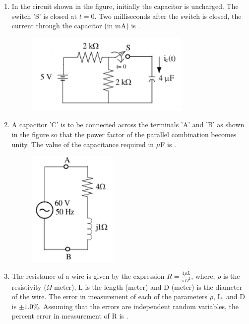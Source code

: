 \documentclass[journal,12pt,onecolumn]{IEEEtran}
\theoremstyle{remark}
\begin{document}
\begin{enumerate}
    \item In the circuit shown in the figure, initially the capacitor is uncharged. The switch 'S' is closed at $t=0$. Two milliseconds after the switch is closed, the current through the capacitor (in mA) is \underline{\hspace{2cm}}.
    \begin{figure}[H]
        \centering
        \includegraphics[width=0.4\columnwidth]{q29}
        \caption*{}
        \label{fig:placeholder}
    \end{figure}
    
    \item A capacitor 'C' is to be connected across the terminals 'A' and 'B' as shown in the figure so that the power factor of the parallel combination becomes unity. The value of the capacitance required in $\mu$F is \underline{\hspace{2cm}}.
    \begin{figure}[H]
        \centering
        \includegraphics[width=0.4\columnwidth]{q30}
        \caption*{}
        \label{fig:placeholder}
    \end{figure}
    
    \item The resistance of a wire is given by the expression $R = \frac{4\rho L}{\pi D^2}$, where, $\rho$ is the resistivity ($\Omega$-meter), L is the length (meter) and D (meter) is the diameter of the wire. The error in measurement of each of the parameters $\rho$, L, and D is $\pm1.0\%$. Assuming that the errors are independent random variables, the percent error in measurement of R is \underline{\hspace{2cm}}.


\end{enumerate}
\end{document}
